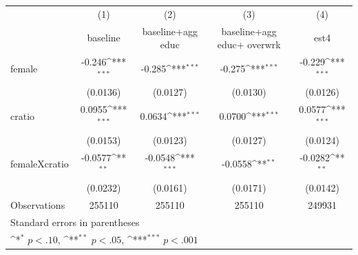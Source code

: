 {
\def\sym#1{\ifmmode^{#1}\else\(^{#1}\)\fi}
\begin{tabular}{l*{4}{c}}
\hline\hline
                    &\multicolumn{1}{c}{(1)}&\multicolumn{1}{c}{(2)}&\multicolumn{1}{c}{(3)}&\multicolumn{1}{c}{(4)}\\
                    &\multicolumn{1}{c}{baseline }&\multicolumn{1}{c}{baseline+agg educ}&\multicolumn{1}{c}{baseline+agg educ+ overwrk}&\multicolumn{1}{c}{est4}\\
\hline
female              &      -0.246\sym{***}&      -0.285\sym{***}&      -0.275\sym{***}&      -0.229\sym{***}\\
                    &    (0.0136)         &    (0.0127)         &    (0.0130)         &    (0.0126)         \\
[1em]
cratio              &      0.0955\sym{***}&      0.0634\sym{***}&      0.0700\sym{***}&      0.0577\sym{***}\\
                    &    (0.0153)         &    (0.0123)         &    (0.0127)         &    (0.0124)         \\
[1em]
femaleXcratio       &     -0.0577\sym{**} &     -0.0548\sym{***}&     -0.0558\sym{**} &     -0.0282\sym{**} \\
                    &    (0.0232)         &    (0.0161)         &    (0.0171)         &    (0.0142)         \\
\hline
Observations        &      255110         &      255110         &      255110         &      249931         \\
\hline\hline
\multicolumn{5}{l}{\footnotesize Standard errors in parentheses}\\
\multicolumn{5}{l}{\footnotesize \sym{*} \(p<.10\), \sym{**} \(p<.05\), \sym{***} \(p<.001\)}\\
\end{tabular}
}
